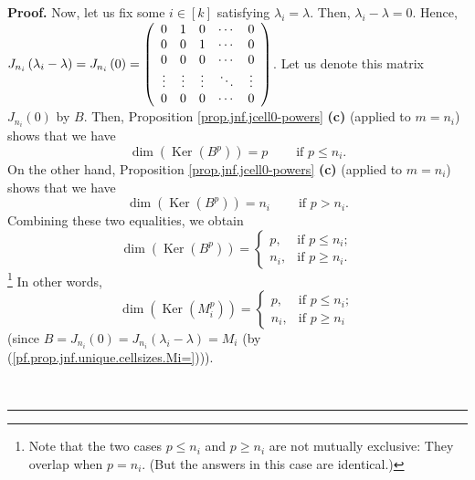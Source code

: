 \documentclass[numbers=enddot,12pt,final,onecolumn,notitlepage]{scrartcl}%
\numberwithin{exer}{subsection}
\theoremstyle{definition}
\newenvironment{proof}[1][Proof]{\noindent\textbf{#1.} }{\ \rule{0.5em}{0.5em}}
\begin{document}
\begin{proof}
Now, let us fix some $i\in\left[  k\right]  $ satisfying $\lambda_{i}=\lambda
$. Then, $\lambda_{i}-\lambda=0$. Hence, $J_{n_{i}}\left(  \lambda_{i}%
-\lambda\right)  =J_{n_{i}}\left(  0\right)  =\left(
\begin{array}
[c]{ccccc}%
0 & 1 & 0 & \cdots & 0\\
0 & 0 & 1 & \cdots & 0\\
0 & 0 & 0 & \cdots & 0\\
\vdots & \vdots & \vdots & \ddots & \vdots\\
0 & 0 & 0 & \cdots & 0
\end{array}
\right)  $. Let us denote this matrix $J_{n_{i}}\left(  0\right)  $ by $B$.
Then, Proposition \ref{prop.jnf.jcell0-powers} \textbf{(c)} (applied to
$m=n_{i}$) shows that we have
\[
\dim\left(  \operatorname*{Ker}\left(  B^{p}\right)  \right)
=p\ \ \ \ \ \ \ \ \ \ \text{if }p\leq n_{i}.
\]
On the other hand, Proposition \ref{prop.jnf.jcell0-powers} \textbf{(c)}
(applied to $m=n_{i}$) shows that we have
\[
\dim\left(  \operatorname*{Ker}\left(  B^{p}\right)  \right)  =n_{i}%
\ \ \ \ \ \ \ \ \ \ \text{if }p>n_{i}.
\]
Combining these two equalities, we obtain
\[
\dim\left(  \operatorname*{Ker}\left(  B^{p}\right)  \right)  =%
\begin{cases}
p, & \text{if }p\leq n_{i};\\
n_{i}, & \text{if }p\geq n_{i}.
\end{cases}
\]
\footnote{Note that the two cases $p\leq n_{i}$ and $p\geq n_{i}$ are not
mutually exclusive: They overlap when $p=n_{i}$. (But the answers in this case
are identical.)} In other words,%
\begin{equation}
\dim\left(  \operatorname*{Ker}\left(  M_{i}^{p}\right)  \right)  =%
\begin{cases}
p, & \text{if }p\leq n_{i};\\
n_{i}, & \text{if }p\geq n_{i}%
\end{cases}
\label{pf.prop.jnf.unique.cellsizes.nullity1}%
\end{equation}
(since $B=J_{n_{i}}\left(  0\right)  =J_{n_{i}}\left(  \lambda_{i}%
-\lambda\right)  =M_{i}$ (by (\ref{pf.prop.jnf.unique.cellsizes.Mi=}))).


\end{proof}
\end{document}
